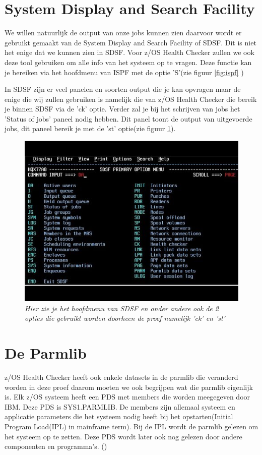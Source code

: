 \section{System Display and Search Facility}
\label{sec:System Display and Search Facility}

We willen natuurlijk de output van onze jobs kunnen zien daarvoor wordt er gebruikt gemaakt van de System Display and Search Facility of SDSF. Dit is niet het enige dat we kunnen zien in SDSF. Voor z/OS Health Checker zullen we ook deze tool gebruiken om alle info van het systeem op te vragen. Deze functie kan je bereiken via het hoofdmenu van ISPF met de optie 'S'(zie figuur \ref{fig:ispf} )

In SDSF zijn er veel panelen en soorten output die je kan opvragen maar de enige die wij zullen gebruiken is namelijk die van z/OS Health Checker die bereik je binnen SDSF via de 'ck' optie. Verder zal je bij het schrijven van jobs het 'Status of jobs' paneel nodig hebben. Dit panel toont de output van uitgevoerde jobs, dit paneel bereik je met de 'st' optie(zie figuur \ref{fig:sdsf}).

\begin{figure}[h]
	\centering
	\includegraphics[width=0.7\linewidth]{img/SDSF}
	\caption[SDSF Hoofdmenu]{{\small \textit{Hier zie je het hoofdmenu van SDSF en onder andere ook de 2 opties die gebruikt worden doorheen de proef namelijk 'ck' en 'st'}}}
	\label{fig:sdsf}
\end{figure}

 
\section{De Parmlib}
\label{sec:De Parmlib}

z/OS Health Checker heeft ook enkele datasets in de parmlib die veranderd worden in deze proef daarom moeten we ook begrijpen wat die parmlib eigenlijk is. Elk z/OS systeem heeft een PDS met members die worden meegegeven door IBM. Deze PDS is SYS1.PARMLIB. De members zijn allemaal systeem en applicatie parameters die het systeem nodig heeft bij het opstarten(Initial Program Load(IPL) in mainframe term). Bij de IPL wordt de parmlib gelezen om het systeem op te zetten. Deze PDS wordt later ook nog gelezen door andere componenten en programma's. (\cite{Cosimo2018})
 
